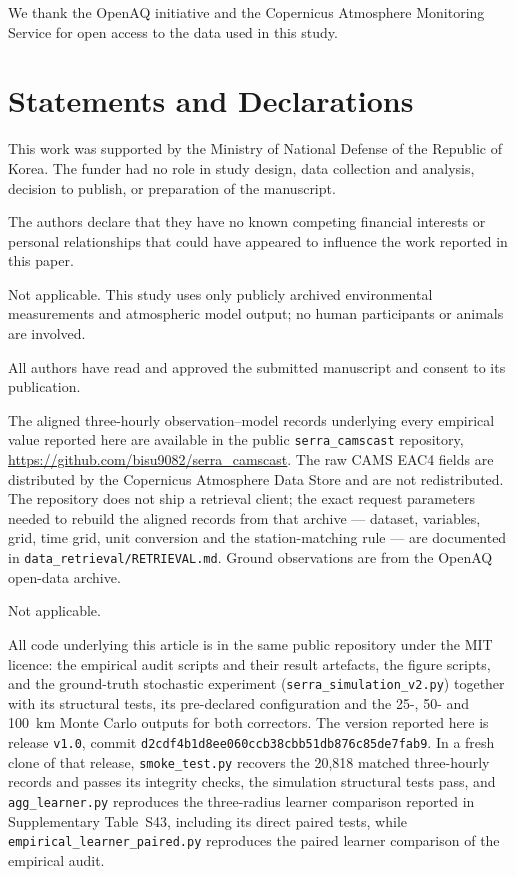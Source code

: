 \documentclass[sn-basic,lineno]{sn-jnl}
\begin{document}
We thank the OpenAQ initiative and the Copernicus Atmosphere Monitoring Service for open access
to the data used in this study.

\section*{Statements and Declarations}

This work was supported by the Ministry of National Defense of the Republic of Korea. The funder
had no role in study design, data collection and analysis, decision to publish, or preparation
of the manuscript.

The authors declare that they have no known competing financial interests or personal
relationships that could have appeared to influence the work reported in this paper.

Not applicable. This study uses only publicly archived environmental measurements and
atmospheric model output; no human participants or animals are involved.

All authors have read and approved the submitted manuscript and consent to its publication.

The aligned three-hourly observation--model records underlying every empirical value reported
here are available in the public \texttt{serra\_camscast} repository,
\url{https://github.com/bisu9082/serra_camscast}. The raw CAMS EAC4 fields are distributed by
the Copernicus Atmosphere Data Store and are not redistributed. The repository does not ship a
retrieval client; the exact request parameters needed to rebuild the aligned records from that
archive --- dataset, variables, grid, time grid, unit conversion and the station-matching rule ---
are documented in \texttt{data\_retrieval/RETRIEVAL.md}. Ground observations are from the OpenAQ open-data archive.

Not applicable.

All code underlying this article is in the same public repository under the MIT licence:
the empirical audit scripts and their result artefacts, the figure scripts, and the
ground-truth stochastic experiment (\texttt{serra\_simulation\_v2.py}) together with its
structural tests, its pre-declared configuration and the 25-, 50- and 100~km Monte Carlo
outputs for both correctors. The version reported here is release \texttt{v1.0}, commit
\texttt{d2cdf4b1d8ee060ccb38cbb51db876c85de7fab9}. In a fresh clone of that release,
\texttt{smoke\_test.py} recovers the 20,818 matched three-hourly records and passes its
integrity checks, the simulation structural tests pass, and \texttt{agg\_learner.py}
reproduces the three-radius learner comparison reported in Supplementary Table~S43, including its direct paired tests, while \texttt{empirical\_learner\_paired.py} reproduces the paired learner comparison of the empirical audit.
\end{document}
